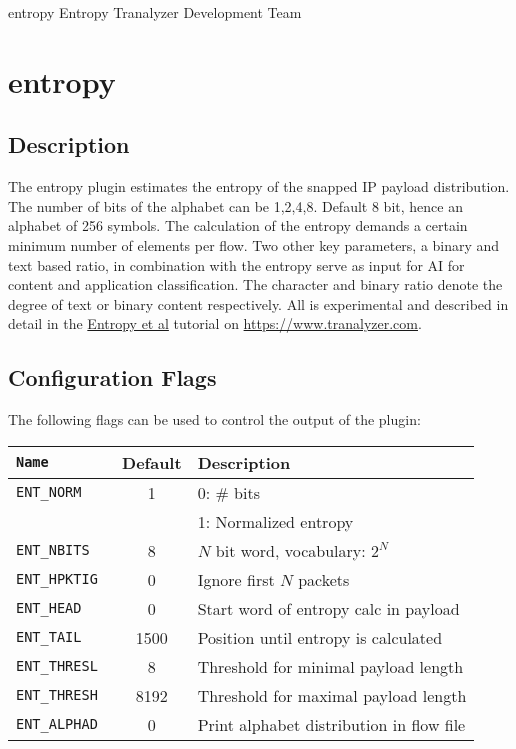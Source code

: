 \documentclass[documentation]{subfiles}
\begin{document}
\trantitle
    {entropy}
    {Entropy}
    {Tranalyzer Development Team}

\section{entropy}\label{s:entropy}

\subsection{Description}
The entropy plugin estimates the entropy of the snapped IP payload distribution.
The number of bits of the alphabet can be 1,2,4,8. Default 8 bit, hence an alphabet of 256 symbols.
The calculation of the entropy demands a certain minimum number of elements per flow.
Two other key parameters, a binary and text based ratio, in combination with the entropy serve as input for AI for content and application classification. The character and binary ratio denote the degree of text or binary
content respectively. All is experimental and described in detail in the
\href{https://tranalyzer.com/tutorial/entropy}{Entropy et al} tutorial on \url{https://www.tranalyzer.com}.

\subsection{Configuration Flags}
The following flags can be used to control the output of the plugin:
\begin{longtable}{>{\tt}lcl}
    \toprule
    {\bf Name}  & {\bf Default}           & {\bf Description}\\
    \midrule\endhead%
    ENT\_NORM   & 1                       & 0: \# bits\\
                &                         & 1: Normalized entropy\\
    ENT\_NBITS  & 8                       & $N$ bit word, vocabulary: $2^N$\\
    ENT\_HPKTIG & 0                       & Ignore first $N$ packets\\
    ENT\_HEAD   & 0                       & Start word of entropy calc in payload\\
    ENT\_TAIL   & 1500                    & Position until entropy is calculated\\
    ENT\_THRESL & 8                       & Threshold for minimal payload length\\
    ENT\_THRESH & 8192                    & Threshold for maximal payload length\\
    ENT\_ALPHAD & 0                       & Print alphabet distribution in flow file\\
    \bottomrule
\end{longtable}
\end{document}
